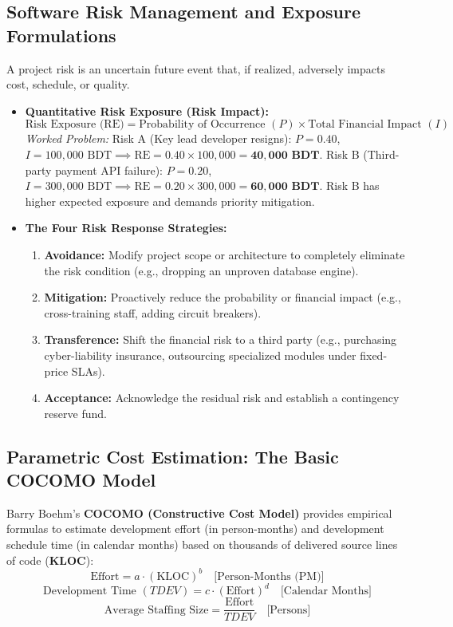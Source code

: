 \subsection{Software Risk Management and Exposure Formulations}
A project risk is an uncertain future event that, if realized, adversely impacts cost, schedule, or quality.
\begin{itemize}
    \item \textbf{Quantitative Risk Exposure (Risk Impact):}
    \begin{equation}
    \boxed{\text{Risk Exposure (RE)} = \text{Probability of Occurrence } (P) \times \text{Total Financial Impact } (I)}
    \end{equation}
    \textit{Worked Problem:} Risk A (Key lead developer resigns): $P = 0.40$, $I = 100,000\text{ BDT} \implies \text{RE} = 0.40 \times 100,000 = \mathbf{40,000\text{ BDT}}$. Risk B (Third-party payment API failure): $P = 0.20$, $I = 300,000\text{ BDT} \implies \text{RE} = 0.20 \times 300,000 = \mathbf{60,000\text{ BDT}}$. Risk B has higher expected exposure and demands priority mitigation.
    \item \textbf{The Four Risk Response Strategies:}
    \begin{enumerate}
        \item \textbf{Avoidance:} Modify project scope or architecture to completely eliminate the risk condition (e.g., dropping an unproven database engine).
        \item \textbf{Mitigation:} Proactively reduce the probability or financial impact (e.g., cross-training staff, adding circuit breakers).
        \item \textbf{Transference:} Shift the financial risk to a third party (e.g., purchasing cyber-liability insurance, outsourcing specialized modules under fixed-price SLAs).
        \item \textbf{Acceptance:} Acknowledge the residual risk and establish a contingency reserve fund.
    \end{enumerate}
\end{itemize}

\subsection{Parametric Cost Estimation: The Basic COCOMO Model}
Barry Boehm's \textbf{COCOMO (Constructive Cost Model)} provides empirical formulas to estimate development effort (in person-months) and development schedule time (in calendar months) based on thousands of delivered source lines of code (\textbf{KLOC}):
\begin{equation}
\boxed{\text{Effort} = a \cdot (\text{KLOC})^b \quad \text{[Person-Months (PM)]}}
\end{equation}
\begin{equation}
\boxed{\text{Development Time } (TDEV) = c \cdot (\text{Effort})^d \quad \text{[Calendar Months]}}
\end{equation}
\begin{equation}
\boxed{\text{Average Staffing Size} = \frac{\text{Effort}}{TDEV} \quad \text{[Persons]}}
\end{equation}

